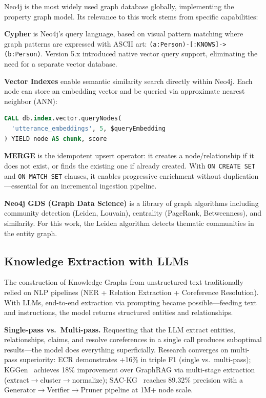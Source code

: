 Neo4j is the most widely used graph database globally, implementing the property graph model. Its relevance to this work stems from specific capabilities:

\textbf{Cypher} is Neo4j's query language, based on visual pattern matching where graph patterns are expressed with ASCII art: \texttt{(a:Person)-[:KNOWS]->(b:Person)}. Version 5.x introduced native vector query support, eliminating the need for a separate vector database.

\textbf{Vector Indexes} enable semantic similarity search directly within Neo4j. Each node can store an embedding vector and be queried via approximate nearest neighbor (ANN):

\begin{lstlisting}[language=SQL, caption={Neo4j vector similarity query}]
CALL db.index.vector.queryNodes(
  'utterance_embeddings', 5, $queryEmbedding
) YIELD node AS chunk, score
\end{lstlisting}

\textbf{MERGE} is the idempotent upsert operator: it creates a node/relationship if it does not exist, or finds the existing one if already created. With \texttt{ON CREATE SET} and \texttt{ON MATCH SET} clauses, it enables progressive enrichment without duplication---essential for an incremental ingestion pipeline.

\textbf{Neo4j GDS (Graph Data Science)} is a library of graph algorithms including community detection (Leiden, Louvain), centrality (PageRank, Betweenness), and similarity. For this work, the Leiden algorithm detects thematic communities in the entity graph.

\subsection{Knowledge Extraction with LLMs}

The construction of Knowledge Graphs from unstructured text traditionally relied on NLP pipelines (NER + Relation Extraction + Coreference Resolution). With LLMs, end-to-end extraction via prompting became possible---feeding text and instructions, the model returns structured entities and relationships.

\textbf{Single-pass vs.\ Multi-pass.} Requesting that the LLM extract entities, relationships, claims, and resolve coreferences in a single call produces suboptimal results---the model does everything superficially. Research converges on multi-pass superiority: ECR demonstrates +16\% in triple F1 (single vs.\ multi-pass); KGGen~\cite{mo2025kggen} achieves 18\% improvement over GraphRAG via multi-stage extraction (extract$\rightarrow$cluster$\rightarrow$normalize); SAC-KG~\cite{chen2024sackg} reaches 89.32\% precision with a Generator$\rightarrow$Verifier$\rightarrow$Pruner pipeline at 1M+ node scale.

